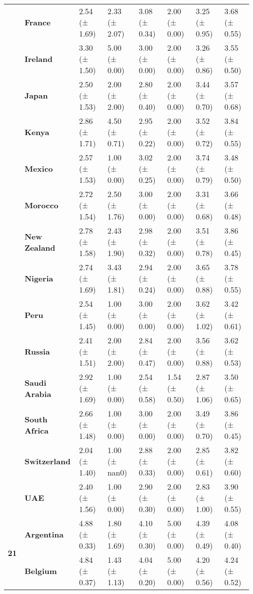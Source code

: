 \begin{tabular}{llllllll}
\textbf{} & \textbf{France} & 2.54 (± 1.69) & 2.33 (± 2.07) & 3.08 (± 0.34) & 2.00 (± 0.00) & 3.25 (± 0.95) & 3.68 (± 0.55) \\
\textbf{} & \textbf{Ireland} & 3.30 (± 1.50) & 5.00 (± 0.00) & 3.00 (± 0.00) & 2.00 (± 0.00) & 3.26 (± 0.86) & 3.55 (± 0.50) \\
\textbf{} & \textbf{Japan} & 2.50 (± 1.53) & 2.00 (± 2.00) & 2.80 (± 0.40) & 2.00 (± 0.00) & 3.44 (± 0.70) & 3.57 (± 0.68) \\
\textbf{} & \textbf{Kenya} & 2.86 (± 1.71) & 4.50 (± 0.71) & 2.95 (± 0.22) & 2.00 (± 0.00) & 3.52 (± 0.72) & 3.84 (± 0.55) \\
\textbf{} & \textbf{Mexico} & 2.57 (± 1.53) & 1.00 (± 0.00) & 3.02 (± 0.25) & 2.00 (± 0.00) & 3.74 (± 0.79) & 3.48 (± 0.50) \\
\textbf{} & \textbf{Morocco} & 2.72 (± 1.54) & 2.50 (± 1.76) & 3.00 (± 0.00) & 2.00 (± 0.00) & 3.31 (± 0.68) & 3.66 (± 0.48) \\
\textbf{} & \textbf{New Zealand} & 2.78 (± 1.58) & 2.43 (± 1.90) & 2.98 (± 0.32) & 2.00 (± 0.00) & 3.51 (± 0.78) & 3.86 (± 0.45) \\
\textbf{} & \textbf{Nigeria} & 2.74 (± 1.69) & 3.43 (± 1.81) & 2.94 (± 0.24) & 2.00 (± 0.00) & 3.65 (± 0.88) & 3.78 (± 0.55) \\
\textbf{} & \textbf{Peru} & 2.54 (± 1.45) & 1.00 (± 0.00) & 3.00 (± 0.00) & 2.00 (± 0.00) & 3.62 (± 1.02) & 3.42 (± 0.61) \\
\textbf{} & \textbf{Russia} & 2.41 (± 1.51) & 2.00 (± 2.00) & 2.84 (± 0.47) & 2.00 (± 0.00) & 3.56 (± 0.88) & 3.62 (± 0.53) \\
\textbf{} & \textbf{Saudi Arabia} & 2.92 (± 1.69) & 1.00 (± 0.00) & 2.54 (± 0.58) & 1.54 (± 0.50) & 2.87 (± 1.06) & 3.50 (± 0.65) \\
\textbf{} & \textbf{South Africa} & 2.66 (± 1.48) & 1.00 (± 0.00) & 3.00 (± 0.00) & 2.00 (± 0.00) & 3.49 (± 0.70) & 3.86 (± 0.45) \\
\textbf{} & \textbf{Switzerland} & 2.04 (± 1.40) & 1.00 (± nan0) & 2.88 (± 0.33) & 2.00 (± 0.00) & 2.85 (± 0.61) & 3.82 (± 0.60) \\
\textbf{} & \textbf{UAE} & 2.40 (± 1.56) & 1.00 (± 0.00) & 2.90 (± 0.30) & 2.00 (± 0.00) & 2.83 (± 1.00) & 3.90 (± 0.55) \\
\cline{1-8}
\multirow[t]{19}{*}{\textbf{21}} & \textbf{Argentina} & 4.88 (± 0.33) & 1.80 (± 1.69) & 4.10 (± 0.30) & 5.00 (± 0.00) & 4.39 (± 0.49) & 4.08 (± 0.40) \\
\textbf{} & \textbf{Belgium} & 4.84 (± 0.37) & 1.43 (± 1.13) & 4.04 (± 0.20) & 5.00 (± 0.00) & 4.20 (± 0.56) & 4.24 (± 0.52) \\

\end{tabular}
